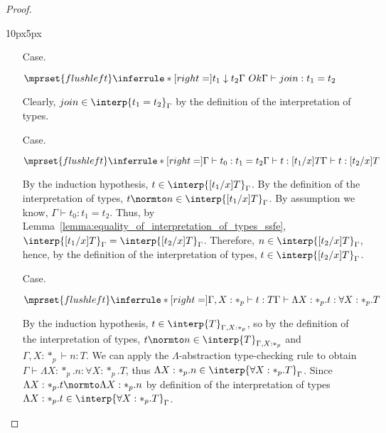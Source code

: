 \begin{proof}
\begin{changemargin}{10px}{5px}
\begin{itemize}
\item[Case.]\ \\
  \begin{center}
    \begin{math}
      $$\mprset{flushleft}
      \inferrule* [right=] {
        t_1 \downarrow t_2
	\\
	\Gamma\ Ok
      }{\Gamma \vdash join : t_1 = t_2}
    \end{math}
  \end{center}
  Clearly, $join \in \interp{t_1 = t_2}_\Gamma$ by the definition of the 
  interpretation of types.
  
\item[Case.]\ \\
  \begin{center}
    \begin{math}
      $$\mprset{flushleft}
      \inferrule* [right=] {
        \Gamma \vdash t_0:t_1 = t_2
        \\
        \Gamma \vdash t:[t_1/x]T
      }{\Gamma \vdash t:[t_2/x]T}
    \end{math}
  \end{center}
  By the induction hypothesis, $t \in \interp{[t_1/x]T}_\Gamma$.
  By the definition of the interpretation of types, $t \normto n \in
  \interp{[t_1/x]T}_\Gamma$.  By assumption we know, $\Gamma \vdash
  t_0:t_1 = t_2$. Thus, by
  Lemma~\ref{lemma:equality_of_interpretation_of_types_ssfe},
  $\interp{[t_1/x]T}_\Gamma = \interp{[t_2/x]T}_\Gamma$.
  Therefore, $n \in \interp{[t_2/x]T}_\Gamma$, hence, by the
  definition of the interpretation of types, $t \in
  \interp{[t_2/x]T}_\Gamma$.
  
\item[Case.]\ \\
  \begin{center}
    \begin{math}
      $$\mprset{flushleft}
      \inferrule* [right=] {
        \Gamma, X : *_p \vdash t : T
      }{\Gamma \vdash \Lambda X:*_p.t:\forall X:*_p.T}
    \end{math}
  \end{center}
  By the induction hypothesis, $t \in \interp{T}_{\Gamma,X:*_p}$, so
  by the definition of the interpretation of types, $t \normto n \in
  \interp{T}_{\Gamma,X:*_p}$ and $\Gamma,X:*_p \vdash n:T$.
  We can apply the $\Lambda$-abstraction type-checking rule to
  obtain $\Gamma \vdash \Lambda X:*_p.n:\forall X:*_p.T$, thus
  $\Lambda X:*_p.n \in \interp{\forall X:*_p.T}_{\Gamma}$.  Since
  $\Lambda X:*_p.t \normto \Lambda X:*_p.n$ by definition of the
  interpretation of types 
  $\Lambda X:*_p.t \in \interp{\forall X:*_p.T}_{\Gamma}$.


\end{itemize}
\end{changemargin}
\end{proof}
